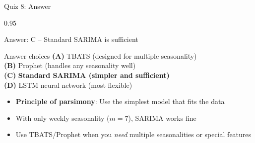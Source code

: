 \documentclass[9pt, aspectratio=169, t]{beamer}
\begin{document}
\begin{frame}{Quiz 8: Answer}
    \begin{cminipage}{0.95\textwidth}
    \begin{exampleblock}{Answer: C -- Standard SARIMA is sufficient}

    \begin{block}{Answer choices}
        \textcolor{MainBlue}{\textbf{(A)}} TBATS (designed for multiple seasonality) \incorrect\\[3pt]
        \textcolor{MainBlue}{\textbf{(B)}} Prophet (handles any seasonality well) \incorrect\\[3pt]
        \textcolor{MainBlue}{\textbf{(C)}} \textbf{\textcolor{Forest}{Standard SARIMA (simpler and sufficient)}} \correct\\[3pt]
        \textcolor{MainBlue}{\textbf{(D)}} LSTM neural network (most flexible) \incorrect
    \end{block}

        \vspace{0.3cm}

        \begin{itemize}
            \item \textbf{Principle of parsimony}: Use the simplest model that fits the data
            \item With only weekly seasonality ($m=7$), SARIMA works fine
            \item Use TBATS/Prophet when you \textit{need} multiple seasonalities or special features
        \end{itemize}
    \end{exampleblock}

    \end{cminipage}
\end{frame}
\end{document}
